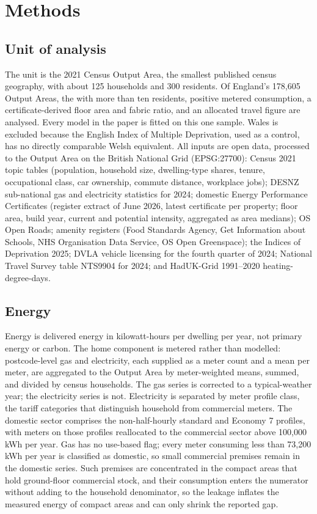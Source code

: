 \documentclass[pdflatex,sn-nature]{sn-jnl}
\begin{document}
\section*{Methods}

\subsection*{Unit of analysis}

The unit is the 2021 Census Output Area, the smallest published census geography, with about 125 households and 300 residents. Of England's 178,605 Output Areas, the \nepisampleN{} with more than ten residents, positive metered consumption, a certificate-derived floor area and fabric ratio, and an allocated travel figure are analysed. Every model in the paper is fitted on this one sample. Wales is excluded because the English Index of Multiple Deprivation, used as a control, has no directly comparable Welsh equivalent. All inputs are open data, processed to the Output Area on the British National Grid (EPSG:27700): Census 2021 topic tables (population, household size, dwelling-type shares, tenure, occupational class, car ownership, commute distance, workplace jobs); DESNZ sub-national gas and electricity statistics for 2024; domestic Energy Performance Certificates (register extract of June 2026, latest certificate per property; floor area, build year, current and potential intensity, aggregated as area medians); OS Open Roads; amenity registers (Food Standards Agency, Get Information about Schools, NHS Organisation Data Service, OS Open Greenspace); the Indices of Deprivation 2025; DVLA vehicle licensing for the fourth quarter of 2024; National Travel Survey table NTS9904 for 2024; and HadUK-Grid 1991--2020 heating-degree-days.

\subsection*{Energy}

Energy is delivered energy in kilowatt-hours per dwelling per year, not primary energy or carbon. The home component is metered rather than modelled: postcode-level gas and electricity, each supplied as a meter count and a mean per meter, are aggregated to the Output Area by meter-weighted means, summed, and divided by census households. The gas series is corrected to a typical-weather year; the electricity series is not. Electricity is separated by meter profile class, the tariff categories that distinguish household from commercial meters. The domestic sector comprises the non-half-hourly standard and Economy 7 profiles, with meters on those profiles reallocated to the commercial sector above 100,000 kWh per year. Gas has no use-based flag; every meter consuming less than 73,200 kWh per year is classified as domestic, so small commercial premises remain in the domestic series. Such premises are concentrated in the compact areas that hold ground-floor commercial stock, and their consumption enters the numerator without adding to the household denominator, so the leakage inflates the measured energy of compact areas and can only shrink the reported gap.
\end{document}
